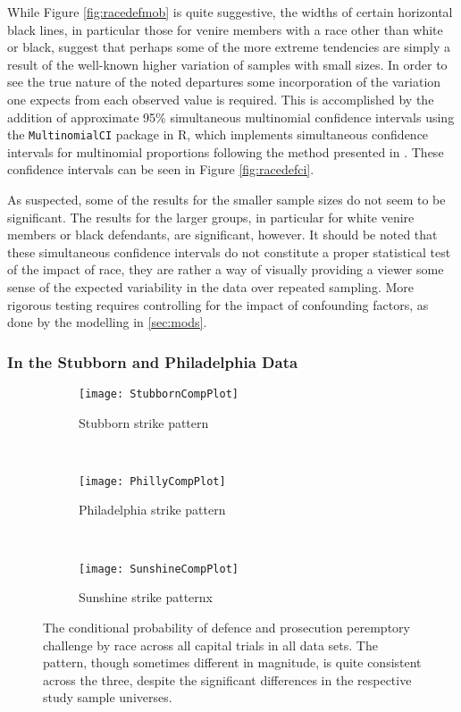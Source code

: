 While Figure \ref{fig:racedefmob} is quite suggestive, the widths of certain horizontal black lines, in particular those for
venire members with a race other than white or black, suggest that perhaps some of the more extreme tendencies are simply a result
of the well-known higher variation of samples with small sizes. In order to see the true nature of the noted departures some
incorporation of the variation one expects from each observed value is required. This is accomplished by the addition of
approximate 95\% simultaneous multinomial confidence intervals using the \texttt{MultinomialCI} package in R, which implements
simultaneous confidence intervals for multinomial proportions following the method presented in \cite{sison1995}. These confidence
intervals can be seen in Figure \ref{fig:racedefci}.

As suspected, some of the results for the smaller sample sizes do not seem to be significant. The results for the larger groups,
in particular for white venire members or black defendants, are significant, however. It should be noted that these simultaneous
confidence intervals do not constitute a proper statistical test of the impact of race, they are rather a way of visually
providing a viewer some sense of the expected variability in the data over repeated sampling. More rigorous testing requires
controlling for the impact of confounding factors, as done by the modelling in \ref{sec:mods}.

\subsubsection{In the Stubborn and Philadelphia Data}

\begin{figure}[h!]
  \centering
  \begin{subfigure}{0.4\textwidth}
    \texttt{[image: StubbornCompPlot]}
    \caption{\footnotesize Stubborn strike pattern}
    \label{fig:stubcomp}
  \end{subfigure}
  ~
  \begin{subfigure}{0.4\textwidth}
    \texttt{[image: PhillyCompPlot]}
    \caption{\footnotesize Philadelphia strike pattern}
    \label{fig:philcomp}
  \end{subfigure}
  ~
  \begin{subfigure}{0.4\textwidth}
    \texttt{[image: SunshineCompPlot]}
    \caption{\footnotesize Sunshine strike patternx}
    \label{fig:suncomp}
  \end{subfigure}
  \caption[Strikes by Racial Combination (All Capital Trial Data)]
  {\footnotesize The conditional probability of defence and prosecution peremptory challenge by race across all
    capital trials in all data sets. The pattern, though sometimes different in magnitude, is quite consistent across the three,
    despite the significant differences in the respective study sample universes.}
  \label{fig:racedefalldata}
\end{figure}

